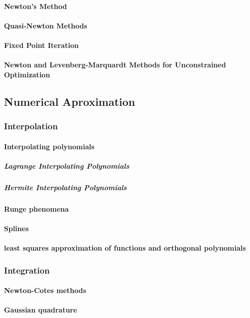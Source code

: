 \documentclass[a4paper,12pt]{article} %
\begin{document}
\paragraph{Newton's Method}
\paragraph{Quasi-Newton Methods}
\paragraph{Fixed Point Iteration}
\paragraph{Newton and Levenberg-Marquardt Methods for Unconstrained Optimization}

\subsection{Numerical Aproximation}
\subsubsection{Interpolation}
\paragraph{Interpolating polynomials}
\subparagraph{Lagrange Interpolating Polynomials}
\subparagraph{Hermite Interpolating Polynomials}
\paragraph{Runge phenomena}
\paragraph{Splines}
\paragraph{least squares approximation of functions and orthogonal polynomials}

\subsubsection{Integration}
\paragraph{Newton-Cotes methods}
\paragraph{Gaussian quadrature}
\end{document}

